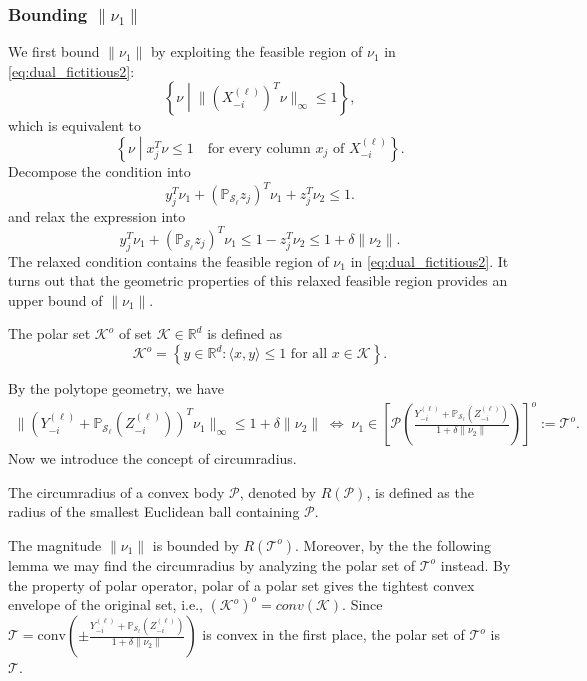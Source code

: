 \documentclass[twoside,11pt]{article}
\numberwithin{equation}{section}
\begin{document}
\subsubsection{Bounding \texorpdfstring{$\|\nu_1\|$}{||nu1||}}
We first bound $\|\nu_1\|$ by exploiting the feasible region of $\nu_1$ in \eqref{eq:dual_fictitious2}:
$$\left\{\nu \middle| \|(X^{(\ell)}_{-i})^T\nu\|_{\infty} \leq 1\right\},$$
which is equivalent to
$$\left\{\nu \middle| x_j^T\nu\leq 1 \quad\text{for every column $x_j$ of $X^{(\ell)}_{-i}$}\right\}.$$
Decompose the condition into
$$y_j^T\nu_1+(\mathbb{P}_{\mathcal{S}_{\ell}} z_j)^T\nu_1+ z_j^T\nu_2\leq 1.$$
and relax the expression into
\begin{equation}\label{eq:relax_constraint}
  y_j^T\nu_1+(\mathbb{P}_{\mathcal{S}_{\ell}} z_j)^T\nu_1 \leq 1-z_j^T\nu_2\leq 1+\delta\|\nu_2\|.
\end{equation}
The relaxed condition contains the feasible region of $\nu_1$ in \eqref{eq:dual_fictitious2}.
It turns out that the geometric properties of this relaxed feasible region provides an upper bound of $\|\nu_1\|$.
\begin{definition}
The polar set $\mathcal{K}^o$ of set $\mathcal{K} \in \mathbb{R}^d$ is defined as
\begin{equation*}
    \mathcal{K}^o = \left\{y\in \mathbb{R}^d: \langle x,y\rangle \leq 1\text{ for all } x\in \mathcal{K}\right\}.
\end{equation*}
\end{definition}
By the polytope geometry, we have
\begin{equation}\label{eq:Geometric_dual}
\begin{aligned}
  \|(Y_{-i}^{(\ell)}+\mathbb{P}_{\mathcal{S}_{\ell}}(Z_{-i}^{(\ell)}))^T\nu_1\|_{\infty} \leq  1+\delta\|\nu_2\|
  \;\Leftrightarrow \; \nu_1 \in \left[\mathcal{P}\left(\frac{Y_{-i}^{(\ell)}+\mathbb{P}_{\mathcal{S}_{\ell}}(Z_{-i}^{(\ell)})}{1+\delta\|\nu_2\|}\right)\right]^o := \mathcal{T}^o.
\end{aligned}
\end{equation}
Now we introduce the concept of circumradius.
\begin{definition}[circumradius]
The circumradius of a convex body $\mathcal{P}$, denoted by $R(\mathcal{P})$, is defined as the radius of the smallest Euclidean ball containing $\mathcal{P}$.
\end{definition}
The magnitude $\|\nu_1\|$ is bounded by $R(\mathcal{T}^o )$. Moreover, by the the following lemma we may find the circumradius by analyzing the polar set of $\mathcal{T}^o$ instead. By the property of polar operator, polar of a polar set gives the tightest convex envelope of the original set, i.e., $(\mathcal{K}^o)^o = conv(\mathcal{K})$. Since $\mathcal{T}=\mathrm{conv}\left(\pm \frac{Y_{-i}^{(\ell)}+\mathbb{P}_{\mathcal{S}_{\ell}}(Z_{-i}^{(\ell)})}{1+\delta\|\nu_2\|}\right)$ is convex in the first place, the polar set of $\mathcal{T}^o$ is  $\mathcal{T}$.
\end{document}
